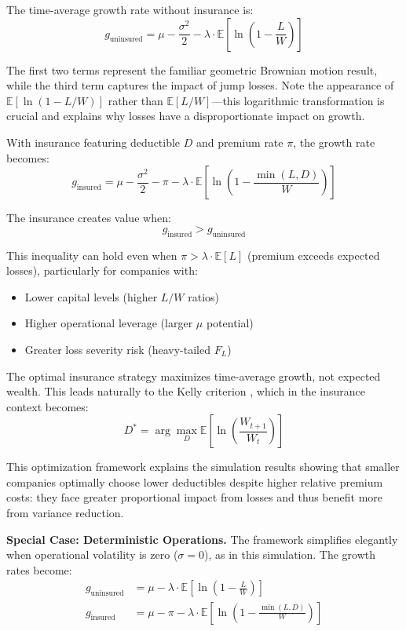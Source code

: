 \documentclass[11pt,letterpaper]{article}
\newcommand{\E}{\mathbb{E}}
\begin{document}
The time-average growth rate without insurance is:
\begin{equation}
g_{\text{uninsured}} = \mu - \frac{\sigma^2}{2} - \lambda \cdot \E\left[\ln\left(1 - \frac{L}{W}\right)\right]
\end{equation}

The first two terms represent the familiar geometric Brownian motion result, while the third term captures the impact of jump losses. Note the appearance of $\E[\ln(1 - L/W)]$ rather than $\E[L/W]$—this logarithmic transformation is crucial and explains why losses have a disproportionate impact on growth.

With insurance featuring deductible $D$ and premium rate $\pi$, the growth rate becomes:
\begin{equation}
g_{\text{insured}} = \mu - \frac{\sigma^2}{2} - \pi - \lambda \cdot \E\left[\ln\left(1 - \frac{\min(L, D)}{W}\right)\right]
\end{equation}

The insurance creates value when:
\begin{equation}
g_{\text{insured}} > g_{\text{uninsured}}
\end{equation}

This inequality can hold even when $\pi > \lambda \cdot \E[L]$ (premium exceeds expected losses), particularly for companies with:
\begin{itemize}
    \item Lower capital levels (higher $L/W$ ratios)
    \item Higher operational leverage (larger $\mu$ potential)
    \item Greater loss severity risk (heavy-tailed $F_L$)
\end{itemize}

The optimal insurance strategy maximizes time-average growth, not expected wealth. This leads naturally to the Kelly criterion \citep{kelly1956new}, which in the insurance context becomes:
\begin{equation}
D^* = \arg\max_D \E\left[\ln\left(\frac{W_{t+1}}{W_t}\right)\right]
\end{equation}

This optimization framework explains the simulation results showing that smaller companies optimally choose lower deductibles despite higher relative premium costs: they face greater proportional impact from losses and thus benefit more from variance reduction.

\textbf{Special Case: Deterministic Operations.} The framework simplifies elegantly when operational volatility is zero ($\sigma = 0$), as in this simulation. The growth rates become:
\begin{align}
g_{\text{uninsured}} &= \mu - \lambda \cdot \E\left[\ln\left(1 - \frac{L}{W}\right)\right] \\
g_{\text{insured}} &= \mu - \pi - \lambda \cdot \E\left[\ln\left(1 - \frac{\min(L,D)}{W}\right)\right]
\end{align}
\end{document}

